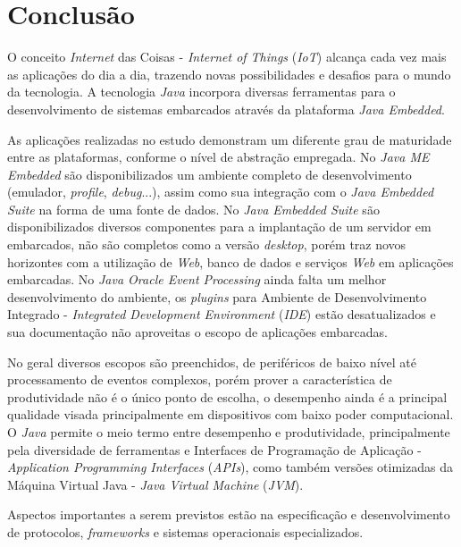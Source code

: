 %

\chapter{Conclusão}

O conceito \textit{Internet} das Coisas - \textit{Internet of Things}
(\textit{IoT}) alcança cada vez mais as aplicações do dia a dia, trazendo novas
possibilidades e desafios para o mundo da tecnologia.  A tecnologia
\textit{Java} incorpora diversas ferramentas para o desenvolvimento de sistemas
embarcados através da plataforma \textit{Java Embedded}.

As aplicações realizadas no estudo demonstram um diferente grau de maturidade
entre as plataformas, conforme o nível de abstração empregada.  No \textit{Java
    ME Embedded} são disponibilizados um ambiente completo de desenvolvimento
(emulador, \textit{profile}, \textit{debug}...), assim como sua integração com
o \textit{Java Embedded Suite} na forma de uma fonte de dados.  No \textit{Java
    Embedded Suite} são disponibilizados diversos componentes para a
implantação de um servidor em embarcados, não são completos como a versão
\textit{desktop}, porém traz novos horizontes com a utilização de \textit{Web},
banco de dados e serviços \textit{Web} em aplicações embarcadas.  No
\textit{Java Oracle Event Processing} ainda falta um melhor desenvolvimento do
ambiente, os \textit{plugins} para Ambiente de Desenvolvimento Integrado -
\textit{Integrated Development Environment} (\textit{IDE}) estão desatualizados
e sua documentação não aproveitas o escopo de aplicações embarcadas.

No geral diversos escopos são preenchidos, de periféricos de baixo nível até
processamento de eventos complexos, porém prover a característica de
produtividade não é o único ponto de escolha, o desempenho ainda é a principal
qualidade visada principalmente em dispositivos com baixo poder computacional.
O \textit{Java} permite o meio termo entre desempenho e produtividade,
principalmente pela diversidade de ferramentas e Interfaces de Programação de
Aplicação - \textit{Application Programming Interfaces} (\textit{APIs}), como
também versões otimizadas da Máquina Virtual Java - \textit{Java Virtual
    Machine} (\textit{JVM}).

Aspectos importantes a serem previstos estão na especificação e desenvolvimento
de protocolos, \textit{frameworks} e sistemas operacionais especializados.
